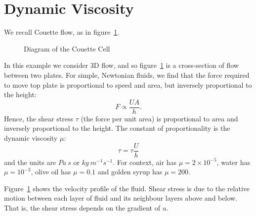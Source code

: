 \documentclass[../Main.tex]{subfiles}
\begin{document}
\section{Dynamic Viscosity}
We recall Couette flow, as in figure~\ref{figCouetteCell}.
\begin{figure}
    \centering
    \caption{Diagram of the Couette Cell}
    \label{figCouetteCell}
\end{figure}
In this example we consider 3D flow, and so figure~\ref{figCouetteCell} is a cross-section of flow between two plates. For simple, Newtonian fluids, we find that the force required to move top plate is proportional to speed and area, but inversely proportional to the height:
\begin{equation*}
    F \propto \frac{UA}{h}.
\end{equation*}
Hence, the shear stress $\tau$ (the force per unit area) is proportional to area and inversely proportional to the height. The constant of proportionality is the dynamic viscosity $\mu$:
\begin{equation*}
    \tau = \tau \frac{U}{h}
\end{equation*}
and the units are $Pa~s$ or $kg~m^{-1}s^{-1}$. For context, air has $\mu = 2\times10^{-5}$, water has $\mu = 10^{-3}$, olive oil has $\mu = 0.1$ and golden syrup has $\mu = 200$.

Figure~\ref{figCouetteCell} shows the velocity profile of the fluid. Shear stress is due to the relative motion between each layer of fluid and its neighbour layers above and below. That is, the shear stress depends on the gradient of $u$.
\end{document}
